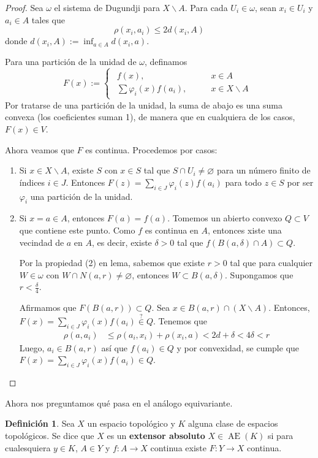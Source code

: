 \documentclass[spanish]{article}
\theoremstyle{definition}
\newtheorem*{defn}{Definición}
\DeclareMathOperator{\AEx}{AE}
\begin{document}
\begin{proof}
	Sea $\omega$ el sistema de Dugundji para $X\backslash A$. Para cada $U_i\in\omega$, sean $x_i\in U_i$ y $a_i\in A$ tales que
	\[\rho(x_i,a_i)\leq 2d(x_i,A)\]
	donde $d(x_i,A):=\inf_{a\in A}d(x_i,a)$.
	
	Para una partición de la unidad de $\omega$, definamos
	\[F(x):=\begin{cases}
		\begin{aligned}
			f(x),\qquad&x\in A\\
			\sum\varphi_i(x)f(a_i),\qquad&x\in X\backslash A
		\end{aligned}
	\end{cases}\]
	Por tratarse de una partición de la unidad, la suma de abajo es una suma convexa (los coeficientes suman 1), de manera que en cualquiera de los casos, $F(x)\in V$.
	
	Ahora veamos que $F$ es continua. Procedemos por casos:
	
	\begin{enumerate}
		\item Si $x\in X\backslash A$, existe $S$ con $x\in S$ tal que $S\cap U_i\neq\varnothing$ para un número finito de índices $i\in J$. Entonces $F(z)=\sum_{i\in J}\varphi_i(z)f(a_i)$ para todo $z\in S$ por ser $\varphi_i$ una partición de la unidad.
	
		\item Si $x=a\in A$, entonces $F(a)=f(a)$. Tomemos un abierto convexo $Q\subset V$ que contiene este punto. Como $f$ es continua en $A$, entonces xiste una vecindad de $a$ en $A$, es decir, existe $\delta>0$ tal que $f(B(a,\delta)\cap A)\subset Q$.
		
		Por la propiedad (2) en lema, sabemos que existe $r>0$ tal que para cualquier $W\in\omega$ con $W\cap N(a,r)\neq\varnothing$, entonces $W\subset B(a,\delta)$. Supongamos que $r<\frac{\delta}{4}$.
		
		Afirmamos que $F(B(a,r))\subset Q$. Sea $x\in B(a,r)\cap(X\backslash A)$. Entonces, $F(x)=\sum_{i\in J}\varphi_i(x)f(a_i)\overset{?}{\in }Q$. Tenemos que
		\begin{align*}
			\rho(a,a_i)&\leq\rho(a_i,x_i)+\rho(x_i,a)<2d+\delta<4\delta<r
		\end{align*}
		Luego, $a_i\in B(a,r)$ así que $f(a_i)\in Q$ y por convexidad, se cumple que $F(x)=\sum_{i\in J}\varphi_i(x)f(a_i)\in Q$.
	\end{enumerate}
\end{proof}
Ahora nos preguntamos qué pasa en el análogo equivariante.
\begin{defn}
	Sea $X$ un espacio topológico y $K$ alguna clase de espacios topológicos. Se dice que $X$ es un \textbf{extensor absoluto} $X\in\AEx(K)$ si para cualesquiera $y\in K$, $A\in Y$ y $f:A\to X$ continua existe $F:Y\to X$ continua.
\end{defn}
\end{document}
